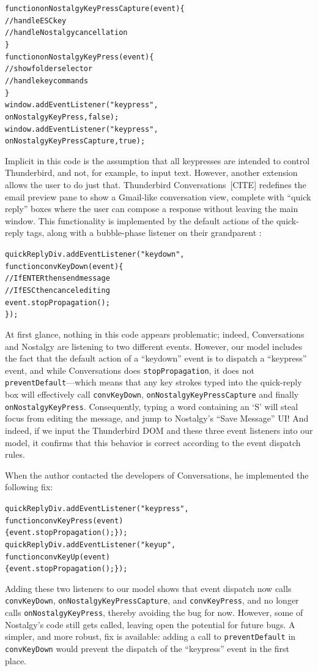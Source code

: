 \documentclass[letterpaper,10pt,twocolumn]{article}
\newcommand{\quot}{\mbox{\tt\char'042}}
\newcommand{\wild}{\mbox{\tt\char'137}}
\newcommand{\impl}[1]{{\def\_{\wild}\def\"{\quot}\tt#1}}
\begin{document}
\begin{alltt}
function onNostalgyKeyPressCapture(event) \{
  // handle ESC key
  // handle Nostalgy cancellation
\}
function onNostalgyKeyPress(event) \{
  // show folder selector
  // handle key commands
\}
window.addEventListener("keypress", 
          onNostalgyKeyPress, false);
window.addEventListener("keypress", 
          onNostalgyKeyPressCapture, true);
\end{alltt}

Implicit in this code is the assumption that all keypresses are
intended to control Thunderbird, and not, for example, to input text.
However, another extension allows the user to do just that.
Thunderbird Conversations~[CITE] redefines the email preview pane to
show a Gmail-like conversation view, complete with ``quick reply''
boxes where the user can compose a response without leaving the main
window.  This functionality is implemented by the default actions of
the quick-reply  tags, along with a bubble-phase
listener on their grandparent :
\begin{alltt}
quickReplyDiv.addEventListener("keydown", 
  function convKeyDown(event) \{
    // If ENTER then send message
    // If ESC then cancel editing
    event.stopPropagation();
  \});
\end{alltt}

At first glance, nothing in this code appears problematic; indeed,
Conversations and Nostalgy are listening to two different events.
However, our model includes the fact that the default action of a
``keydown'' event is to dispatch a ``keypress'' event, and while
Conversations does \impl{stopPropagation}, it does not
\impl{preventDefault}---which means that any key strokes typed into
the quick-reply box will effectively call \impl{convKeyDown},
\impl{onNostalgyKeyPressCapture} and finally
\impl{onNostalgyKeyPress}.  Consequently, typing a word containing an
`S' will steal focus from editing the message, and jump to Nostalgy's
``Save Message'' UI!  And indeed, if we input the Thunderbird DOM and
these three event listeners into our model, it confirms that this
behavior is correct according to the event dispatch rules.

When the author contacted the developers of 
Conversations, he implemented the following fix:
\begin{alltt}
quickReplyDiv.addEventListener("keypress",
  function convKeyPress(event) 
    \{ event.stopPropagation(); \});
quickReplyDiv.addEventListener("keyup",
  function convKeyUp(event)
    \{ event.stopPropagation(); \});
\end{alltt}
Adding these two listeners to our model shows that event dispatch now
calls \impl{convKeyDown}, \impl{onNostalgyKeyPressCapture}, and
\impl{convKeyPress}, and no longer calls \impl{onNostalgyKeyPress},
thereby avoiding the bug for now.  However, some of Nostalgy's code
still gets called, leaving open the potential for future bugs.  A
simpler, and more robust, fix is available: adding a call to
\impl{preventDefault} in \impl{convKeyDown} would prevent the
dispatch of the ``keypress'' event in the first place.
\end{document}
